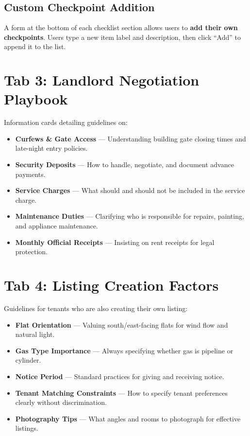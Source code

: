 \documentclass[12pt, a4paper, oneside]{report}
\begin{document}
\subsection{Custom Checkpoint Addition}

A form at the bottom of each checklist section allows users to \textbf{add their own checkpoints}. Users type a new item label and description, then click ``Add'' to append it to the list.

\section{Tab 3: Landlord Negotiation Playbook}

Information cards detailing guidelines on:

\begin{itemize}[leftmargin=2em]
  \item \textbf{Curfews \& Gate Access} --- Understanding building gate closing times and late-night entry policies.
  \item \textbf{Security Deposits} --- How to handle, negotiate, and document advance payments.
  \item \textbf{Service Charges} --- What should and should not be included in the service charge.
  \item \textbf{Maintenance Duties} --- Clarifying who is responsible for repairs, painting, and appliance maintenance.
  \item \textbf{Monthly Official Receipts} --- Insisting on rent receipts for legal protection.
\end{itemize}

\section{Tab 4: Listing Creation Factors}

Guidelines for tenants who are also creating their own listing:

\begin{itemize}[leftmargin=2em]
  \item \textbf{Flat Orientation} --- Valuing south/east-facing flats for wind flow and natural light.
  \item \textbf{Gas Type Importance} --- Always specifying whether gas is pipeline or cylinder.
  \item \textbf{Notice Period} --- Standard practices for giving and receiving notice.
  \item \textbf{Tenant Matching Constraints} --- How to specify tenant preferences clearly without discrimination.
  \item \textbf{Photography Tips} --- What angles and rooms to photograph for effective listings.
\end{itemize}
\end{document}
